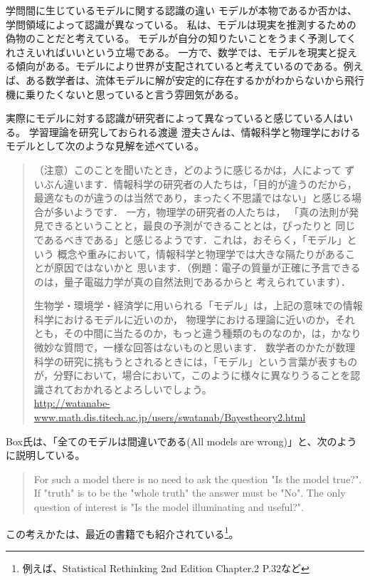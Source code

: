 \begin{SMbox}{学問間に生じているモデルに関する認識の違い}
モデルが本物であるか否かは、学問領域によって認識が異なっている。
私は、モデルは現実を推測するための偽物のことだと考えている。
モデルが自分の知りたいことをうまく予測してくれさえいればいいという立場である。
一方で、数学では、モデルを現実と捉える傾向がある。モデルにより世界が支配されていると考えているのである。例えば、ある数学者は、流体モデルに解が安定的に存在するかがわからないから飛行機に乗りたくないと思っていると言う雰囲気がある。

実際にモデルに対する認識が研究者によって異なっていると感じている人はいる。
学習理論を研究しておられる渡邊 澄夫さんは、情報科学と物理学におけるモデルとして次のような見解を述べている。
\begin{quote}
    （注意）このことを聞いたとき，どのように感じるかは，人によって ずいぶん違います．情報科学の研究者の人たちは，「目的が違うのだから， 最適なものが違うのは当然であり，まったく不思議ではない」と感じる場合が多いようです． 一方，物理学の研究者の人たちは， 「真の法則が発見できるということと，最良の予測ができることとは，ぴったりと 同じであるべきである」と感じるようです．これは，おそらく，「モデル」という 概念や重みにおいて，情報科学と物理学では大きな隔たりがあることが原因ではないかと 思います．（例題：電子の質量が正確に予言できるのは，量子電磁力学が真の自然法則であるからと 考えられています）．

    生物学・環境学・経済学に用いられる「モデル」は，上記の意味での情報科学におけるモデルに近いのか， 物理学における理論に近いのか，それとも，その中間に当たるのか，もっと違う種類のものなのか，は，かなり微妙な質問で，一様な回答はないものと思います． 数学者のかたが数理科学の研究に挑もうとされるときには，「モデル」という言葉が表すものが，分野において，場合において，このように様々に異なりうることを認識されておかれるとよろしいでしょう。
    \\ \url{http://watanabe-www.math.dis.titech.ac.jp/users/swatanab/Bayestheory2.html}
\end{quote}

Box氏は、「全てのモデルは間違いである(All models are wrong)」と、次のように説明している。

\begin{quote}
 For such a model there is no need to ask the question "Is the model true?". If "truth" is to be the "whole truth" the answer must be "No". The only question of interest is "Is the model illuminating and useful?".
\end{quote}
この考えかたは、最近の書籍でも紹介されている\footnote{例えば、Statistical Rethinking 2nd Edition Chapter.2 P.32など}。

\end{SMbox}

